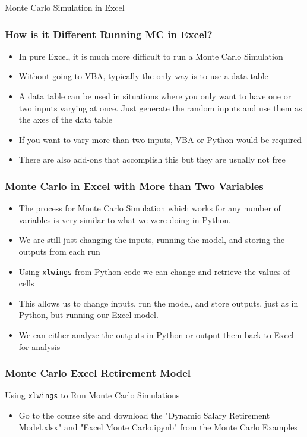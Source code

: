 \documentclass[handout, 11pt]{beamer}
\begin{document}
\begin{section}[Excel MC]{Monte Carlo Simulation in Excel}
\begin{frame}
\frametitle{How is it Different Running MC in Excel?}
\begin{itemize}
\item In pure Excel, it is much more difficult to run a Monte Carlo Simulation
\vfill
\item Without going to VBA, typically the only way is to use a data table
\vfill
\item A data table can be used in situations where you only want to have one or two inputs varying at once. Just generate the random inputs and use them as the axes of the data table
\vfill
\item If you want to vary more than two inputs, VBA or Python would be required
\vfill
\item There are also add-ons that accomplish this but they are usually not free
\end{itemize}
\end{frame}
\begin{frame}
\frametitle{Monte Carlo in Excel with More than Two Variables}
\begin{itemize}
\item The process for Monte Carlo Simulation which works for any number of variables is very similar to what we were doing in Python.
\vfill
\item We are still just changing the inputs, running the model, and storing the outputs from each run
\vfill
\item Using
\texttt{xlwings}
from Python code we can change and retrieve the values of cells
\vfill
\item This allows us to change inputs, run the model, and store outputs, just as in Python, but running our Excel model.
\vfill
\item We can either analyze the outputs in Python or output them back to Excel for analysis
\end{itemize}
\end{frame}
\begin{frame}
\frametitle{Monte Carlo Excel Retirement Model}
{
\begin{block}{Using \texttt{xlwings} to Run Monte Carlo Simulations}
\begin{itemize}
\item Go to the course site and download the "Dynamic Salary Retirement Model.xlsx" and "Excel Monte Carlo.ipynb" from the Monte Carlo Examples

\end{itemize}
\end{block}}
\end{frame}
\end{section}
\end{document}

